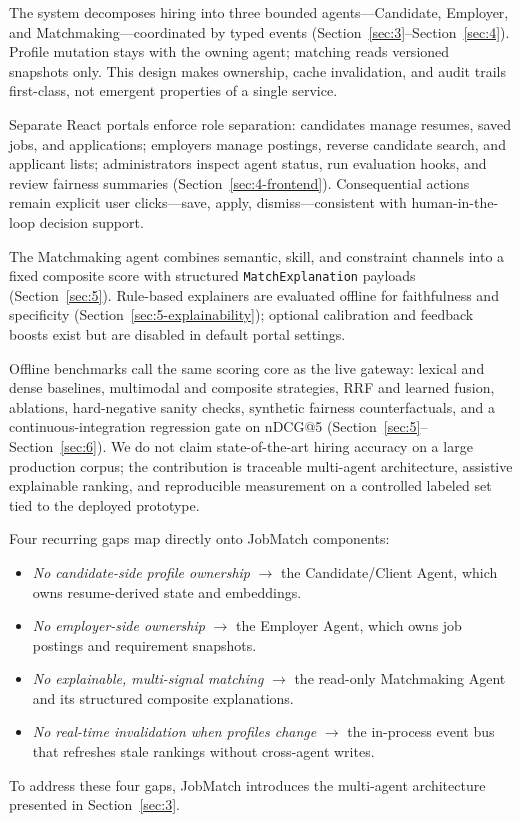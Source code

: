 The system decomposes hiring into three bounded agents---Candidate, Employer, and Matchmaking---coordinated by typed events (Section~\ref{sec:3}--Section~\ref{sec:4}).
Profile mutation stays with the owning agent; matching reads versioned snapshots only.
This design makes ownership, cache invalidation, and audit trails first-class, not emergent properties of a single service.

Separate React portals enforce role separation: candidates manage resumes, saved jobs, and applications; employers manage postings, reverse candidate search, and applicant lists; administrators inspect agent status, run evaluation hooks, and review fairness summaries (Section~\ref{sec:4-frontend}).
Consequential actions remain explicit user clicks---save, apply, dismiss---consistent with human-in-the-loop decision support.

The Matchmaking agent combines semantic, skill, and constraint channels into a fixed composite score with structured \texttt{MatchExplanation} payloads (Section~\ref{sec:5}).
Rule-based explainers are evaluated offline for faithfulness and specificity (Section~\ref{sec:5-explainability}); optional calibration and feedback boosts exist but are disabled in default portal settings.

Offline benchmarks call the same scoring core as the live gateway: lexical and dense baselines, multimodal and composite strategies, RRF and learned fusion, ablations, hard-negative sanity checks, synthetic fairness counterfactuals, and a continuous-integration regression gate on nDCG@5 (Section~\ref{sec:5}--Section~\ref{sec:6}).
We do not claim state-of-the-art hiring accuracy on a large production corpus; the contribution is traceable multi-agent architecture, assistive explainable ranking, and reproducible measurement on a controlled labeled set tied to the deployed prototype.

Four recurring gaps map directly onto JobMatch components:
\begin{itemize}[noitemsep]
  \item \emph{No candidate-side profile ownership} $\rightarrow$ the Candidate/Client Agent, which owns resume-derived state and embeddings.
  \item \emph{No employer-side ownership} $\rightarrow$ the Employer Agent, which owns job postings and requirement snapshots.
  \item \emph{No explainable, multi-signal matching} $\rightarrow$ the read-only Matchmaking Agent and its structured composite explanations.
  \item \emph{No real-time invalidation when profiles change} $\rightarrow$ the in-process event bus that refreshes stale rankings without cross-agent writes.
\end{itemize}
To address these four gaps, JobMatch introduces the multi-agent architecture presented in Section~\ref{sec:3}.
